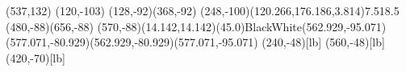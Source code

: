 \begin{axopicture}(537,132) (120,-103)
    \Line[arrow,arrowpos=0.5,arrowlength=10,arrowwidth=8,arrowinset=0.2](128,-92)(368,-92)
    \PhotonArc[clock](248,-100)(120.266,176.186,3.814){7.5}{18.5}
    \Line[arrow,arrowpos=0.5,arrowlength=5,arrowwidth=2,arrowinset=0.2](480,-88)(656,-88)
    \COval(570,-88)(14.142,14.142)(45.0){Black}{White}\Line(562.929,-95.071)(577.071,-80.929)\Line(562.929,-80.929)(577.071,-95.071)
    \Text(240,-48)[lb]{\Huge{}}
    \Text(560,-48)[lb]{\Huge{}}
    \Text(420,-70)[lb]{\Huge{\Black{$+$}}}
\end{axopicture}

